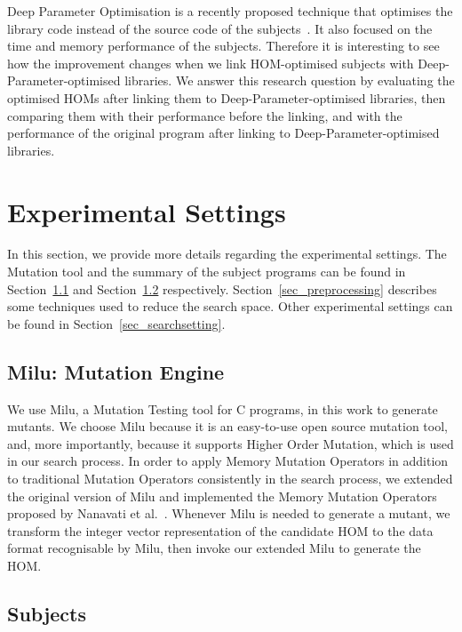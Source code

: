 \documentclass[oribibl]{llncs}
\begin{document}
Deep Parameter Optimisation is a recently proposed technique that optimises the library code instead of the source code of the subjects~\cite{Wu:2015:DPO:2739480.2754648}.
It also focused on the time and memory performance of the subjects.
Therefore it is interesting to see how the improvement changes when we link HOM-optimised subjects with Deep-Parameter-optimised libraries.
We answer this research question by evaluating the optimised HOMs after linking them to Deep-Parameter-optimised libraries, then comparing them with their performance before the linking, and with the performance of the original program after linking to Deep-Parameter-optimised libraries.

\section{Experimental Settings}
\label{sec_exp}

In this section, we provide more details regarding the experimental settings.
The Mutation tool and the summary of the subject programs can be found in Section~\ref{sec_milu} and Section~\ref{sec_subject} respectively.
Section~\ref{sec_preprocessing} describes some techniques used to reduce the search space.
Other experimental settings can be found in Section~\ref{sec_searchsetting}.

\subsection{Milu: Mutation Engine}
\label{sec_milu}

We use Milu, a Mutation Testing tool for C programs, in this work to generate mutants.
We choose Milu because it is an easy-to-use open source mutation tool, and, more importantly, because it supports Higher Order Mutation, which is used in our search process.
In order to apply Memory Mutation Operators in addition to traditional Mutation Operators consistently in the search process, we extended the original version of Milu and implemented the Memory Mutation Operators proposed by Nanavati et al.~\cite{7107449}.
Whenever Milu is needed to generate a mutant, we transform the integer vector representation of the candidate HOM to the data format recognisable by Milu, then invoke our extended Milu to generate the HOM.

\subsection{Subjects}
\label{sec_subject}
\end{document}
